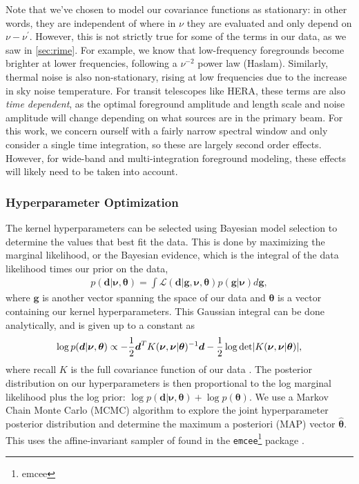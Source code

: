 \documentclass[a4paper,fleqn,usenatbib]{mnras}
\def\d{\boldsymbol{d}}
\def\g{\boldsymbol{g}}
\def\bnu{\boldsymbol{\nu}}
\def\btheta{\boldsymbol{\theta}}
\begin{document}
Note that we've chosen to model our covariance functions as stationary: in other words, they are independent of where in $\nu$ they are evaluated and only depend on $\nu-\nu^\prime$.
However, this is not strictly true for some of the terms in our data, as we saw in \autoref{sec:rime}.
For example, we know that low-frequency foregrounds become brighter at lower frequencies, following a $\nu^{-2}$ power law (Haslam).
Similarly, thermal noise is also non-stationary, rising at low frequencies due to the increase in sky noise temperature.
For transit telescopes like HERA, these terms are also \emph{time dependent}, as the optimal foreground amplitude and length scale and noise amplitude will change depending on what sources are in the primary beam.
For this work, we concern ourself with a fairly narrow spectral window and only consider a single time integration, so these are largely second order effects.
However, for wide-band and multi-integration foreground modeling, these effects will likely need to be taken into account.

\subsubsection{Hyperparameter Optimization}
\label{sec:optimization}
The kernel hyperparameters can be selected using Bayesian model selection to determine the values that best fit the data.
This is done by maximizing the marginal likelihood, or the Bayesian evidence, which is the integral of the data likelihood times our prior on the data,
\begin{align}
p(\d|\bnu, \btheta) = \int \mathcal{L}(\d|\g,\bnu,\btheta)p(\g|\bnu)d\g,
\end{align}
where $\g$ is another vector spanning the space of our data and $\btheta$ is a vector containing our kernel hyperparameters.
This Gaussian integral can be done analytically, and is given up to a constant as
\begin{align}
\label{eq:ml}
\log p(\d|\bnu,\btheta) \propto -\frac{1}{2}\d^TK(\bnu,\bnu|\btheta)^{-1}\d - \frac{1}{2}\log{\rm det}|K(\bnu,\bnu|\btheta)|,
\end{align}
where recall $K$ is the full covariance function of our data \citep{Rasmussen2006}.
The posterior distribution on our hyperparameters is then proportional to the log marginal likelihood plus the log prior: $\log p(\d|\bnu,\btheta) + \log p(\btheta)$.
We use a Markov Chain Monte Carlo (MCMC) algorithm to explore the joint hyperparameter posterior distribution and determine the maximum a posteriori (MAP) vector $\hat{\btheta}$.
This uses the affine-invariant sampler of \citet{Goodman} found in the \texttt{emcee}\footnote{emcee} package \citep{Foreman-Mackey}.
\end{document}
